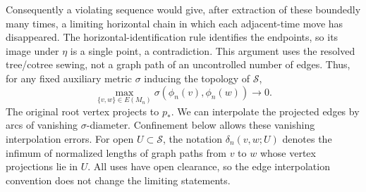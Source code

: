 Consequently a violating sequence would give, after extraction of
these boundedly many times, a limiting horizontal chain in which each
adjacent-time move has disappeared.  The horizontal-identification
rule identifies the endpoints, so its image under \(\eta\) is a
single point, a contradiction.  This argument uses the resolved
tree/cotree sewing, not a graph path of an uncontrolled number of
edges.  Thus, for any fixed auxiliary metric
\(\sigma\) inducing the topology of \(\mathcal S\),
\begin{equation}
 \max_{\{v,w\}\in E(M_n)}
       \sigma(\phi_n(v),\phi_n(w))\longrightarrow0 .
 \label{finite:edge-mesh}
\end{equation}
The original root vertex projects to \(p_*\).
We can interpolate the projected edges by arcs of vanishing
\(\sigma\)-diameter.  Confinement below allows these vanishing
interpolation errors.
For open \(U\subset\mathcal S\), the notation
\(\delta_n(v,w;U)\) denotes the infimum of normalized lengths of
graph paths from \(v\) to \(w\) whose vertex projections lie in \(U\).
All uses have open clearance, so the edge interpolation convention
does not change the limiting statements.

